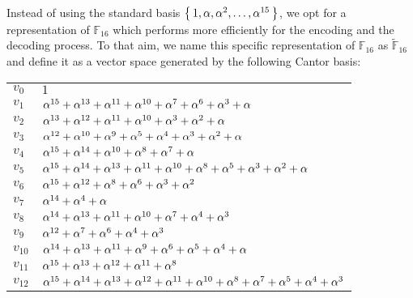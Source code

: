 Instead of using the standard basis $\set{1, \authpool, \authpool^2, \dots, \authpool^{15}}$, we opt for a representation of $\mathbb{F}_{16}$ which performs more efficiently for the encoding and the decoding process. To that aim, we name this specific representation of $\mathbb{F}_{16}$ as $\tilde{\mathbb{F}}_{16}$ and define it as a vector space generated by the following Cantor basis:

\begin{center}
  \begin{tabular}{ll}
    & \\
    \hline
    $v_0$ & $1$\\
    $v_1$ & $\alpha^{15} + \alpha^{13} + \alpha^{11} + \alpha^{10} + \alpha^7
    + \alpha^6 + \alpha^3 + \alpha$\\
    $v_2$ & $\alpha^{13} + \alpha^{12} + \alpha^{11} + \alpha^{10} + \alpha^3
    + \alpha^2 + \alpha$\\
    $v_3$ & $\alpha^{12} + \alpha^{10} + \alpha^9 + \alpha^5 + \alpha^4 +
    \alpha^3 + \alpha^2 + \alpha$\\
    $v_4$ & $\alpha^{15} + \alpha^{14} + \alpha^{10} + \alpha^8 + \alpha^7 +
    \alpha$\\
    $v_5$ & $\alpha^{15} + \alpha^{14} + \alpha^{13} + \alpha^{11} +
    \alpha^{10} + \alpha^8 + \alpha^5 + \alpha^3 + \alpha^2 + \alpha$\\
    $v_6$ & $\alpha^{15} + \alpha^{12} + \alpha^8 + \alpha^6 + \alpha^3 +
    \alpha^2$\\
    $v_7$ & $\alpha^{14} + \alpha^4 + \alpha$\\
    $v_8$ & $\alpha^{14} + \alpha^{13} + \alpha^{11} + \alpha^{10} + \alpha^7
    + \alpha^4 + \alpha^3$\\
    $v_9$ & $\alpha^{12} + \alpha^7 + \alpha^6 + \alpha^4 + \alpha^3$\\
    $v_{10}$ & $\alpha^{14} + \alpha^{13} + \alpha^{11} + \alpha^9 + \alpha^6
    + \alpha^5 + \alpha^4 + \alpha$\\
    $v_{11}$ & $\alpha^{15} + \alpha^{13} + \alpha^{12} + \alpha^{11} + \alpha^8$\\
    $v_{12}$ & $\alpha^{15} + \alpha^{14} + \alpha^{13} + \alpha^{12} + \alpha^{11} + \alpha^{10} + \alpha^8 + \alpha^7 + \alpha^5 + \alpha^4 + \alpha^3$\\

\end{tabular}
\end{center}

